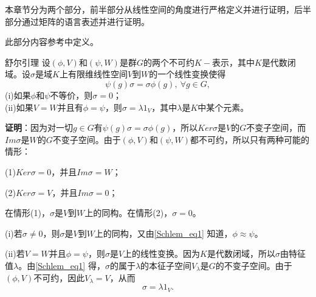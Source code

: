 

本章节分为两个部分，前半部分从线性空间的角度进行严格定义并进行证明，后半部分通过矩阵的语言表述并进行证明。

此部分内容参考\cite{维声表示}中定义。

\begin{lemma}{舒尔引理}
设$(\phi,V)$和$(\psi,W)$是群$G$的两个不可约$K-$表示，其中$K$是代数闭域。设$\sigma$是域$K$上有限维线性空间$V$到$W$的一个线性变换使得
\begin{equation}\label{Schlem_eq1}
\psi(g)\sigma =\sigma \phi(g),~\forall g \in G,
\end{equation}
(i)如果$\phi$和$\psi$不等价，则$\sigma=0$； \\
(ii)如果$V=W$并且有$\phi=\psi$，则$\sigma=\lambda1_V$，其中$\lambda$是$K$中某个元素。
\end{lemma}

\textbf{证明}：因为对一切$g\in G$有$\psi(g)\sigma =\sigma \phi(g)$，所以$Ker\sigma $是$V$的$G$不变子空间，而$Im\sigma$是$W$的$G$不变子空间。由于$(\phi,V)$和$(\psi,W)$都不可约，所以只有两种可能的情形：

(1)$Ker\sigma =0$，并且$Im\sigma=W$；

(2)$Ker\sigma =V$，并且$Im\sigma=0$；

在情形(1)，$\sigma $是$V$到$W$上的同构。在情形(2)，$\sigma=0$。

(i)若$\sigma \neq 0$，则$\sigma$是$V$到$W$上的同构，又由\autoref{Schlem_eq1} 知道，$\phi \approx \psi$。

(ii)若$V=W$并且$\phi=\psi$，则$\sigma$是$V$上的线性变换。因为$K$是代数闭域，所以$\sigma$由特征值$\lambda$。由\autoref{Schlem_eq1} 得，$\sigma$的属于$\lambda$的本征子空间$V_\lambda$是$G$的不变子空间。由于$(\phi,V)$不可约，因此$V_\lambda=V$，从而
\begin{equation}
\sigma=\lambda1_V.
\end{equation}


